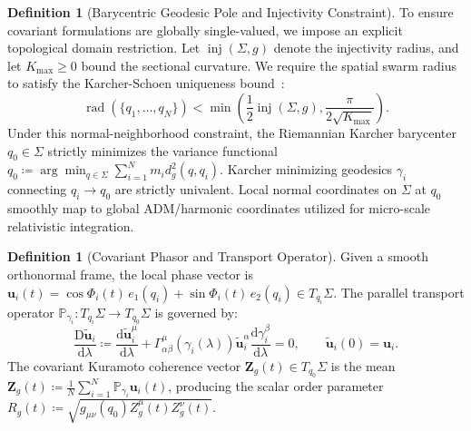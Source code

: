 \documentclass[11pt,a4paper,reqno]{article}
\theoremstyle{plain}
\theoremstyle{definition}
\newtheorem{definition}[theorem]{Definition}
\theoremstyle{remark}
\numberwithin{equation}{section}
\begin{document}
\begin{definition}[Barycentric Geodesic Pole and Injectivity Constraint]
\label{def:barycenter}
To ensure covariant formulations are globally single-valued, we impose an explicit topological domain restriction. Let $\operatorname{inj}(\Sigma, g)$ denote the injectivity radius, and let $K_{\max} \ge 0$ bound the sectional curvature. We require the spatial swarm radius to satisfy the Karcher-Schoen uniqueness bound~\cite{Karcher1977}:
\begin{equation}
\operatorname{rad}(\{q_1, \dots, q_N\}) < \min\left( \frac{1}{2} \operatorname{inj}(\Sigma, g), \frac{\pi}{2\sqrt{K_{\max}}} \right).
\end{equation}
Under this normal-neighborhood constraint, the Riemannian Karcher barycenter $q_0 \in \Sigma$ strictly minimizes the variance functional $q_0 \coloneqq \arg\min_{q \in \Sigma} \sum_{i=1}^N m_i d_g^2(q, q_i)$. Karcher minimizing geodesics $\gamma_i$ connecting $q_i \to q_0$ are strictly univalent. Local normal coordinates on $\Sigma$ at $q_0$ smoothly map to global ADM/harmonic coordinates utilized for micro-scale relativistic integration.
\end{definition}

\begin{definition}[Covariant Phasor and Transport Operator]
Given a smooth orthonormal frame, the local phase vector is $\bm{u}_i(t) = \cos \Phi_i(t) \, e_1(q_i) + \sin \Phi_i(t) \, e_2(q_i) \in T_{q_i}\Sigma$. The parallel transport operator $\mathbb{P}_{\gamma_i}: T_{q_i}\Sigma \to T_{q_0}\Sigma$ is governed by:
\begin{equation}
\frac{\mathrm{D} \widetilde{\bm{u}}_i}{\mathrm{d}\lambda} \coloneqq \frac{\mathrm{d} \widetilde{\bm{u}}_i^\mu}{\mathrm{d}\lambda} + \Gamma^\mu_{\alpha\beta}(\gamma_i(\lambda)) \widetilde{\bm{u}}_i^\alpha \frac{\mathrm{d}\gamma_i^\beta}{\mathrm{d}\lambda} = 0, \qquad \widetilde{\bm{u}}_i(0) = \bm{u}_i.
\end{equation}
The covariant Kuramoto coherence vector $\bm{Z}_g(t) \in T_{q_0}\Sigma$ is the mean $\bm{Z}_g(t) \coloneqq \frac{1}{N} \sum_{i=1}^N \mathbb{P}_{\gamma_i} \bm{u}_i(t)$, producing the scalar order parameter $R_g(t) \coloneqq \sqrt{g_{\mu\nu}(q_0) Z_g^\mu(t) Z_g^\nu(t)}$.
\end{definition}
\end{document}
